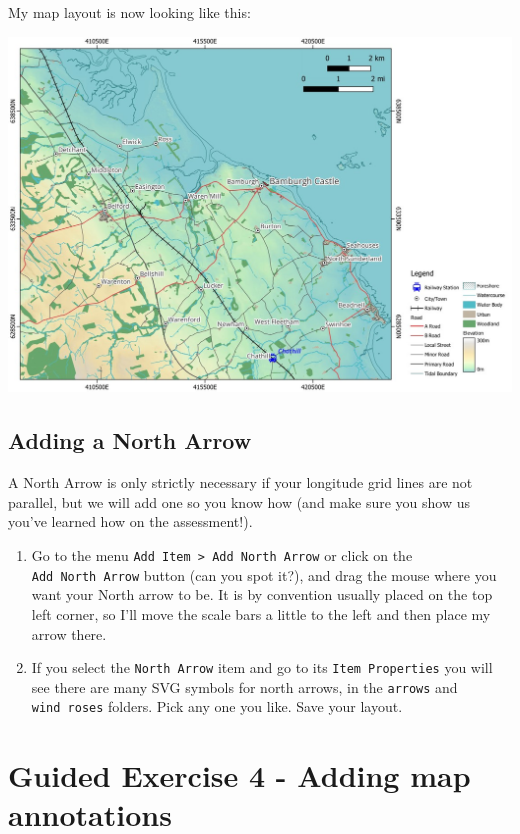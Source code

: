 \documentclass[
  letterpaper,
  DIV=11,
  numbers=noendperiod]{scrreprt}
\begin{document}
My map layout is now looking like this:

\includegraphics{images/lab_8/lab8_fig16_layout_with_grid.jpg}

\subsection{Adding a North Arrow}\label{adding-a-north-arrow}

A North Arrow is only strictly necessary if your longitude grid lines
are not parallel, but we will add one so you know how (and make sure you
show us you've learned how on the assessment!).

\begin{enumerate}
\def\labelenumi{(\arabic{enumi})}
\setcounter{enumi}{262}
\item
  Go to the menu \texttt{Add\ Item\ \textgreater{}\ Add\ North\ Arrow}
  or click on the \texttt{Add\ North\ Arrow} button (can you spot it?),
  and drag the mouse where you want your North arrow to be. It is by
  convention usually placed on the top left corner, so I'll move the
  scale bars a little to the left and then place my arrow there.
\item
  If you select the \texttt{North\ Arrow} item and go to its
  \texttt{Item\ Properties} you will see there are many SVG symbols for
  north arrows, in the \texttt{arrows} and \texttt{wind\ roses} folders.
  Pick any one you like. Save your layout.
\end{enumerate}

\section{Guided Exercise 4 - Adding map
annotations}\label{guided-exercise-4---adding-map-annotations}
\end{document}
